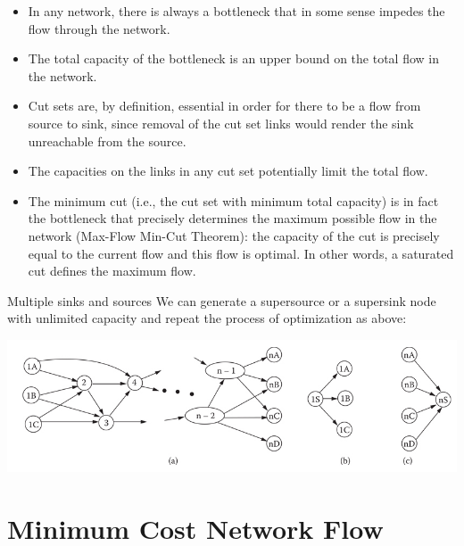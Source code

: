 \documentclass[c]{beamer}
\begin{document}
\begin{frame}
  \begin{itemize}
    \item In any network, there is always a bottleneck that in some sense impedes the flow through the network.
    \item The total capacity of the bottleneck is an upper bound on the total flow in the network.
    \item Cut sets are, by definition, essential in order for there to be a flow from source to sink, since removal of the cut set links would render the sink unreachable from the source.
    \item The capacities on the links in any cut set potentially limit the total flow.
    \item The minimum cut (i.e., the cut set with minimum total capacity) is in fact the bottleneck that precisely determines the maximum possible flow in the network (Max-Flow Min-Cut Theorem): the capacity of the cut is precisely equal to the current flow and this flow is optimal. In other words, a saturated cut defines the maximum flow.
  \end{itemize}
\end{frame}

\begin{frame}{Multiple sinks and sources}
  We can generate a supersource or  a  supersink node with unlimited capacity and repeat the process of optimization as above:
  \begin{center}
    \includegraphics[width=\linewidth]{../figures/multiplesinkssources.png}
  \end{center}
\end{frame}

\section{Minimum Cost Network Flow}
\end{document}

